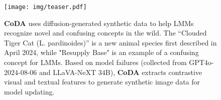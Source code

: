 \begin{figure}[t!]
  \centering
  \texttt{[image: img/teaser.pdf]}
   \caption{ \textbf{CoDA} uses diffusion-generated synthetic data to help LMMs recognize novel and confusing concepts in the wild. The ``Clouded Tiger Cat (L. pardinoides)'' is a new animal species first described in April 2024, while "Resupply Base" is an example of a confusing concept for LMMs. Based on model failures (collected from GPT4o-2024-08-06 and LLaVA-NeXT 34B), \textbf{CoDA} extracts contrastive visual and textual features to generate synthetic image data for model updating.}
   \label{fig:teaser}
\end{figure}
